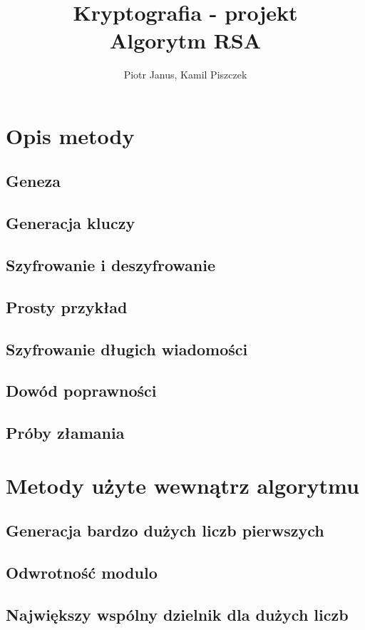 \documentclass[10pt,a4paper]{article}
\begin{document}
	\title{Kryptografia - projekt  \\  Algorytm RSA}
	\author{Piotr Janus, Kamil Piszczek}
	\date{}
	\maketitle

\section{Opis metody}
\subsection{Geneza}
\subsection{Generacja kluczy}
\subsection{Szyfrowanie i deszyfrowanie}
\subsection{Prosty przykład}
\subsection{Szyfrowanie długich wiadomości}
\subsection{Dowód poprawności}
\subsection{Próby złamania}

\section{Metody użyte wewnątrz algorytmu}
\subsection{Generacja bardzo dużych liczb pierwszych}
\subsection{Odwrotność modulo}
\subsection{Największy wspólny dzielnik dla dużych liczb}
\end{document}
